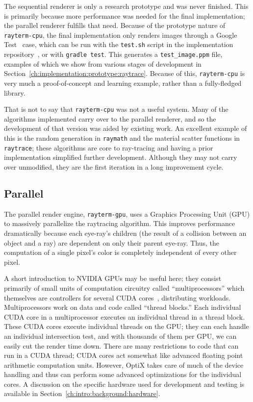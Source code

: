 The sequential renderer is only a research prototype and was never finished.
This is primarily because more performance was needed for the final \name{} implementation; the parallel renderer fulfills that need.
Because of the prototype nature of \texttt{rayterm-cpu}, the final implementation only renders images through a Google Test~\cite{googletest} case, which can be run with the \texttt{test.sh} script in the implementation repository~\cite{raytermCpuImpl}, or with \texttt{gradle test}.
This generates a \texttt{test\_image.ppm} file, examples of which we show from various stages of development in Section~\ref{ch:implementation:prototype:raytrace}.
Because of this, \texttt{rayterm-cpu} is very much a proof-of-concept and learning example, rather than a fully-fledged library.

That is not to say that \texttt{rayterm-cpu} was not a useful system.
Many of the algorithms implemented carry over to the parallel renderer, and so the development of that version was aided by existing work.
An excellent example of this is the random generation in \texttt{raymath} and the material scatter functions in \texttt{raytrace}; these algorithms are core to ray-tracing and having a prior implementation simplified further development.
Although they may not carry over unmodified, they are the first iteration in a long improvement cycle.

\subsection{Parallel}
\label{ch:methods:renderer:parallel}

The parallel render engine, \texttt{rayterm-gpu}, uses a Graphics Processing Unit (GPU) to massively parallelize the raytracing algorithm.
This improves performance dramatically because each eye-ray's children (the result of a collision between an object and a ray) are dependent on only their parent eye-ray.
Thus, the computation of a single pixel's color is completely independent of every other pixel.

A short introduction to NVIDIA GPUs may be useful here; they consist primarily of small units of computation circuitry called ``multiprocessors'' which themselves are controllers for several CUDA cores~\cite{fermi2009nvidia}, distributing workloads.
Multiprocessors work on data and code called ``thread blocks.''
Each individual CUDA core in a multiprocessor executes an individual thread in a thread block.
These CUDA cores execute individual threads on the GPU; they can each handle an individual intersection test, and with thousands of them per GPU, we can easily cut the render time down.
There are many restrictions to code that can run in a CUDA thread; CUDA cores act somewhat like advanced floating point arithmetic computation units.
However, OptiX takes care of much of the device handling and thus can perform some advanced optimizations for the individual cores.
A discussion on the specific hardware used for development and testing is available in Section~\ref{ch:intro:background:hardware}.

